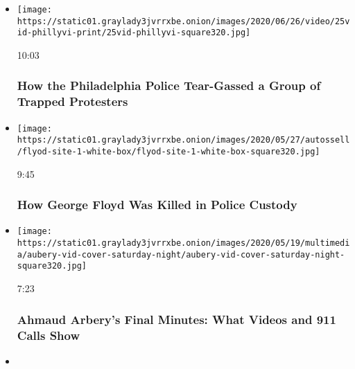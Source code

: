 \begin{itemize}
\item
  \href{https://www.nytimes3xbfgragh.onion/video/us/100000007174941/philadelphia-tear-gas-george-floyd-protests.html?action=click\&module=video-series-bar\&region=header\&pgtype=Article\&playlistId=video/dupont-race-policing}{}

  \texttt{[image: https://static01.graylady3jvrrxbe.onion/images/2020/06/26/video/25vid-phillyvi-print/25vid-phillyvi-square320.jpg]}

  10:03

  \hypertarget{how-the-philadelphia-police-tear-gassed-a-group-of-trapped-protesters}{%
  \subsubsection{How the Philadelphia Police Tear-Gassed a Group of
  Trapped
  Protesters}\label{how-the-philadelphia-police-tear-gassed-a-group-of-trapped-protesters}}
\item
  \href{https://www.nytimes3xbfgragh.onion/video/us/100000007159353/george-floyd-arrest-death-video.html?action=click\&module=video-series-bar\&region=header\&pgtype=Article\&playlistId=video/dupont-race-policing}{}

  \texttt{[image: https://static01.graylady3jvrrxbe.onion/images/2020/05/27/autossell/flyod-site-1-white-box/flyod-site-1-white-box-square320.jpg]}

  9:45

  \hypertarget{how-george-floyd-was-killed-in-police-custody}{%
  \subsubsection{How George Floyd Was Killed in Police
  Custody}\label{how-george-floyd-was-killed-in-police-custody}}
\item
  \href{https://www.nytimes3xbfgragh.onion/video/us/100000007142853/ahmaud-arbery-video-911-georgia.html?action=click\&module=video-series-bar\&region=header\&pgtype=Article\&playlistId=video/dupont-race-policing}{}

  \texttt{[image: https://static01.graylady3jvrrxbe.onion/images/2020/05/19/multimedia/aubery-vid-cover-saturday-night/aubery-vid-cover-saturday-night-square320.jpg]}

  7:23

  \hypertarget{ahmaud-arberys-final-minutes-what-videos-and-911-calls-show}{%
  \subsubsection{Ahmaud Arbery's Final Minutes: What Videos and 911
  Calls
  Show}\label{ahmaud-arberys-final-minutes-what-videos-and-911-calls-show}}
\item
  \href{https://www.nytimes3xbfgragh.onion/video/nyregion/100000006654178/rosedale-documentary-where-are-they-now.html?action=click\&module=video-series-bar\&region=header\&pgtype=Article\&playlistId=video/dupont-race-policing}{}


\end{itemize}
